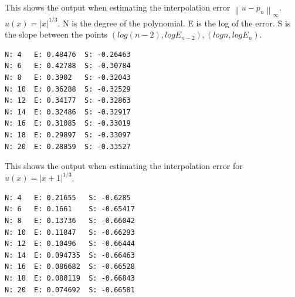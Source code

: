\documentclass[12pt]{article}
\newcommand{\norm}[1]{\left\lVert#1\right\rVert}
\newcommand{\abs}[1]{\left|#1\right|}
\begin{document}
This shows the output when estimating the interpolation error $\norm{u-p_n}_{\infty}$. $u(x) = \abs{x}^{1/3}$.
N is the degree of the polynomial. E is the log of the error. S is the slope between 
the points $(log(n-2), logE_{n-2}), (logn, logE_n)$.

\noindent
\begin{minipage}{\linewidth}
\begin{lstlisting}
N: 4   E: 0.48476  S: -0.26463
N: 6   E: 0.42788  S: -0.30784
N: 8   E: 0.3902   S: -0.32043
N: 10  E: 0.36288  S: -0.32529
N: 12  E: 0.34177  S: -0.32863
N: 14  E: 0.32486  S: -0.32917
N: 16  E: 0.31085  S: -0.33019
N: 18  E: 0.29897  S: -0.33097
N: 20  E: 0.28859  S: -0.33527
\end{lstlisting}
\end{minipage}


\noindent
This shows the output when estimating the interpolation error for $u(x) = \abs{x+1}^{1/3}$.


\noindent
\begin{minipage}{\linewidth}
\begin{lstlisting}
N: 4   E: 0.21655   S: -0.6285
N: 6   E: 0.1661    S: -0.65417
N: 8   E: 0.13736   S: -0.66042
N: 10  E: 0.11847   S: -0.66293
N: 12  E: 0.10496   S: -0.66444
N: 14  E: 0.094735  S: -0.66463
N: 16  E: 0.086682  S: -0.66528
N: 18  E: 0.080119  S: -0.66843
N: 20  E: 0.074692  S: -0.66581
\end{lstlisting}
\end{minipage}

\section{} %

\subsection{} %
\subsection{} %
\end{document}
